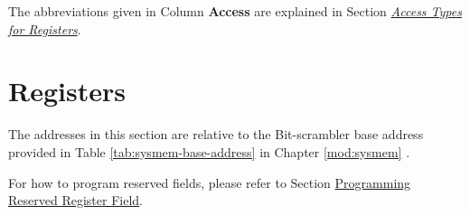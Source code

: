 \documentclass[main\_\_EN.tex]{subfiles}
\begin{document}
The abbreviations given in Column \textbf{Access} are explained in Section \hyperref[glossary-access-types]{\textit{Access Types for Registers}}.






\newpage
\section{Registers}

The addresses in this section are relative to the Bit-scrambler base address provided in Table \ref{tab:sysmem-base-address} in Chapter \ref{mod:sysmem} \textit{}.

For how to program reserved fields, please refer to Section \hyperref[programming-reserved-field]{Programming Reserved Register Field}.


\end{document}
